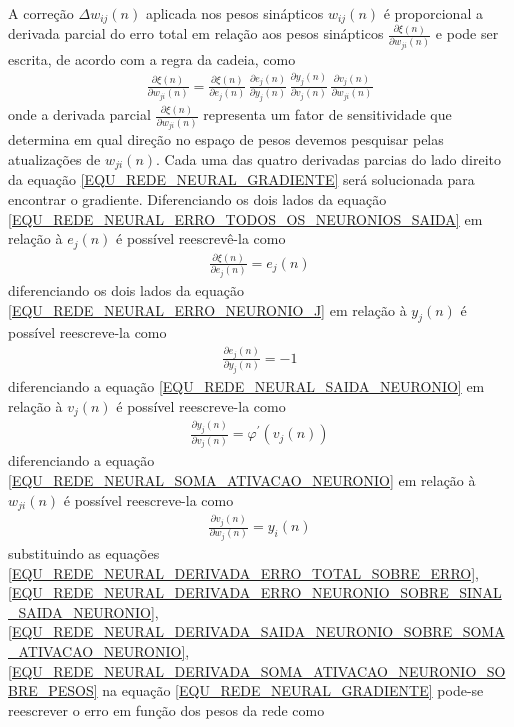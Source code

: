 A correção \(\Delta w_{ij}(n)\) aplicada nos pesos sinápticos \(w_{ij}(n)\) é proporcional a derivada parcial do erro total em relação aos pesos sinápticos \(\frac{\partial \xi(n)}{\partial w_{ji}(n)}\) e pode ser escrita, de acordo com a regra da cadeia, como
\begin{align}
\frac{\partial \xi(n)}{\partial w_{ji}(n)} =
\frac{\partial \xi(n)}{\partial e_{j}(n)} 		\,
\frac{\partial e_{j}(n)}{\partial y_{j}(n)} 	\,
\frac{\partial y_{j}(n)}{\partial v_{j}(n)} 	\,
\frac{\partial v_{j}(n)}{\partial w_{ji}(n)} \label{EQU_REDE_NEURAL_GRADIENTE}
\end{align}
onde a derivada parcial \(\frac{\partial \xi(n)}{\partial w_{ji}(n)}\) representa um fator de sensitividade que determina em qual direção no espaço de pesos devemos pesquisar pelas atualizações de \(w_{ji}(n)\). Cada uma das quatro derivadas parcias do lado direito da equação \eqref{EQU_REDE_NEURAL_GRADIENTE} será solucionada para encontrar o gradiente. Diferenciando os dois lados da equação \eqref{EQU_REDE_NEURAL_ERRO_TODOS_OS_NEURONIOS_SAIDA} em relação à \(e_{j}(n)\) é possível reescrevê-la como
\begin{align}
\frac{\partial \xi(n)}{\partial e_{j}(n)} = e_{j}(n) \label{EQU_REDE_NEURAL_DERIVADA_ERRO_TOTAL_SOBRE_ERRO}
\end{align}
diferenciando os dois lados da equação \eqref{EQU_REDE_NEURAL_ERRO_NEURONIO_J} em relação à \(y_{j}(n)\) é possível reescreve-la como
\begin{align}
\frac{\partial e_{j}(n)}{\partial y_{j}(n)} = -1 \label{EQU_REDE_NEURAL_DERIVADA_ERRO_NEURONIO_SOBRE_SINAL_SAIDA_NEURONIO}
\end{align}
diferenciando a equação \eqref{EQU_REDE_NEURAL_SAIDA_NEURONIO} em relação à \(v_{j}(n)\) é possível reescreve-la como
\begin{align}
\frac{\partial y_{j}(n)}{\partial v_{j}(n)} = \varphi^{'}(v_{j}(n)) \label{EQU_REDE_NEURAL_DERIVADA_SAIDA_NEURONIO_SOBRE_SOMA_ATIVACAO_NEURONIO}
\end{align}
diferenciando a equação \eqref{EQU_REDE_NEURAL_SOMA_ATIVACAO_NEURONIO} em relação à \(w_{ji}(n)\) é possível reescreve-la como
\begin{align}
\frac{\partial v_{j}(n)}{\partial w_{j}(n)} = y_{i}(n) \label{EQU_REDE_NEURAL_DERIVADA_SOMA_ATIVACAO_NEURONIO_SOBRE_PESOS}
\end{align}
substituindo as equações \eqref{EQU_REDE_NEURAL_DERIVADA_ERRO_TOTAL_SOBRE_ERRO}, \eqref{EQU_REDE_NEURAL_DERIVADA_ERRO_NEURONIO_SOBRE_SINAL_SAIDA_NEURONIO}, \eqref{EQU_REDE_NEURAL_DERIVADA_SAIDA_NEURONIO_SOBRE_SOMA_ATIVACAO_NEURONIO}, \eqref{EQU_REDE_NEURAL_DERIVADA_SOMA_ATIVACAO_NEURONIO_SOBRE_PESOS} na equação \eqref{EQU_REDE_NEURAL_GRADIENTE} pode-se reescrever o erro em função dos pesos da rede como
